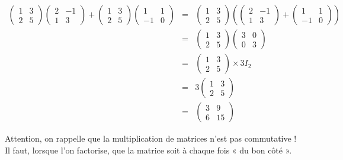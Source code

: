 \documentclass[11pt,fleqn]{book} %
\begin{document}
\begin{example}

\[\begin{array}{rcl}

\begin{pmatrix}1 & 3\\ 2 & 5\end{pmatrix} \begin{pmatrix} 2 & -1 \\ 1 & 3\end{pmatrix} + \begin{pmatrix}1 & 3\\ 2 & 5\end{pmatrix} \begin{pmatrix} 1 & 1 \\ -1 & 0\end{pmatrix} 
& = & \begin{pmatrix}1 & 3\\ 2 & 5\end{pmatrix} \left( \begin{pmatrix} 2 & -1 \\ 1 & 3\end{pmatrix} + \begin{pmatrix} 1 & 1 \\ -1 & 0\end{pmatrix}\right) \\
& = & \begin{pmatrix}1 & 3\\ 2 & 5\end{pmatrix} \begin{pmatrix} 3 & 0 \\ 0 & 3
\end{pmatrix} \\
& = & \begin{pmatrix}1 & 3\\ 2 & 5\end{pmatrix} \times 3 I_2 \\
& = & 3 \begin{pmatrix}1 & 3\\ 2 & 5\end{pmatrix} \\
& = & \begin{pmatrix}3 & 9\\ 6 & 15\end{pmatrix}
\end{array}\]
\vspace{-0.5cm}\end{example}

Attention, on rappelle que la multiplication de matrices n'est pas commutative ! Il faut, lorsque l'on factorise, que la matrice soit à chaque fois « du bon côté ».
\end{document}
